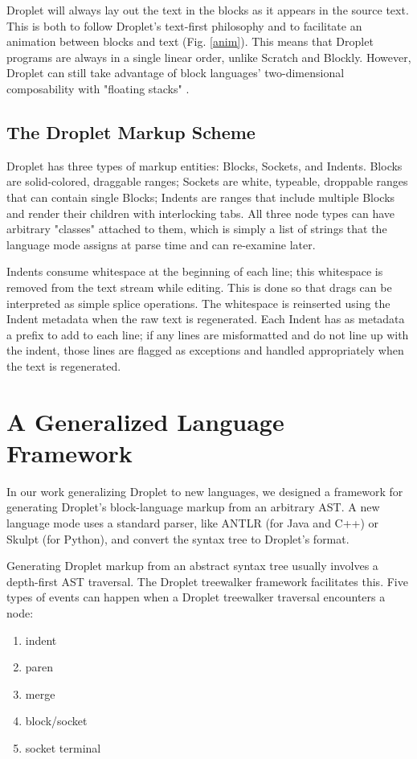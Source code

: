 \documentclass[conference]{IEEEtran}
\begin{document}
Droplet will always lay out the text in the blocks as it appears in the source text. This is both to follow Droplet's text-first philosophy and to facilitate an animation between blocks and text (Fig. \ref{anim}). This means that Droplet programs are always in a single linear order, unlike Scratch and Blockly. However, Droplet can still take advantage of block languages' two-dimensional composability with "floating stacks" \cite{DropletUpdate}.

\subsection{The Droplet Markup Scheme}
Droplet has three types of markup entities: Blocks, Sockets, and Indents. Blocks are solid-colored, draggable ranges; Sockets are white, typeable, droppable ranges that can contain single Blocks; Indents are ranges that include multiple Blocks and render their children with interlocking tabs. All three node types can have arbitrary "classes" attached to them, which is simply a list of strings that the language mode assigns at parse time and can re-examine later.

Indents consume whitespace at the beginning of each line; this whitespace is removed from the text stream while editing. This is done so that drags can be interpreted as simple splice operations. The whitespace is reinserted using the Indent metadata when the raw text is regenerated. Each Indent has as metadata a prefix to add to each line; if any lines are misformatted and do not line up with the indent, those lines are flagged as exceptions and handled appropriately when the text is regenerated.

\section{A Generalized Language Framework}
In our work generalizing Droplet to new languages, we designed a framework for generating Droplet's block-language markup from an arbitrary AST. A new language mode uses a standard parser, like ANTLR (for Java and C++) or Skulpt (for Python), and convert the syntax tree to Droplet's format.

Generating Droplet markup from an abstract syntax tree usually involves a depth-first AST traversal. The Droplet treewalker framework facilitates this. Five types of events can happen when a Droplet treewalker traversal encounters a node:
\begin{enumerate}
  \item indent
  \item paren
  \item merge
  \item block/socket
  \item socket terminal
\end{enumerate}
\end{document}
